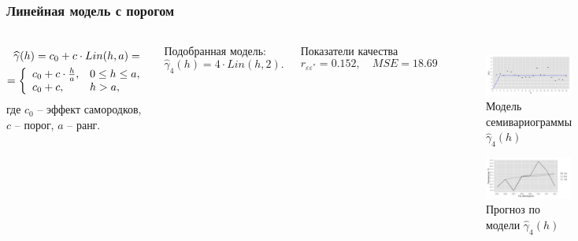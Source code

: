 \documentclass[10pt,pdf,aspectratio=169,hyperref={unicode}]{beamer}
\begin{document}
\begin{frame}
  \frametitle{Линейная модель с порогом}
  \begin{columns}[c]
  \column{3in}
  \begin{equation}\begin{gathered}
  \label{eq:linsill}
    \widehat{\gamma}(h) = c_0 + c \cdot Lin(h, a) = \\
    = \left\{
    \begin{array}{l l}
     c_0 + c \cdot \frac{h}{a}, & 0 \leq h \leq a, \\
     c_0 + c, & h > a,
    \end{array} \right.
  \end{gathered}\end{equation}
  где $ c_0 $ -- эффект самородков, $ c $ -- порог, $ a $ -- ранг.

  \vspace{0.5em}

  Подобранная модель:
  \begin{equation}
  \label{eq:gamma4}
    \widehat{\gamma}_4(h) = 4 \cdot Lin(h, 2).
  \end{equation}

  Показатели качества
  \begin{equation*}
    r_{\varepsilon\varepsilon^{*}} = 0.152, \quad MSE = 18.69
  \end{equation*}

  \column{3in}
  \vspace{-14.5pt}
  \begin{figure}[H]
    \includegraphics[width=0.9\linewidth]{../../figures/variogram/lin-fit-adapt-modeled.png} \\
    \caption{Модель семивариограммы $\widehat{\gamma}_4(h)$}
    \includegraphics[width=0.9\linewidth]{../../figures/variogram/lin-fit-adapt-cross-prediction.png}
    \caption{Прогноз по модели $\widehat{\gamma}_4(h)$}
  \end{figure}
  \end{columns}
\end{frame}
\end{document}
